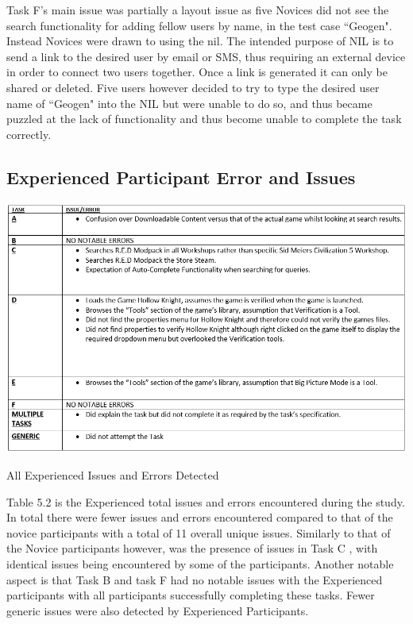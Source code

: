 Task F's main issue was partially a layout issue as five Novices did not see the search functionality for adding fellow users by name, in the test case ``Geogen". Instead Novices were drawn to using the \gls{nil}. The intended purpose of NIL is to send a link to the desired user by email or SMS, thus requiring an external device in order to connect two users together. Once a link is generated it can only be shared or deleted. Five users however decided to try to type the desired user name of ``Geogen" into the NIL but were unable to do so, and thus became puzzled at the lack of functionality and thus become unable to complete the task correctly.

\subsection{Experienced Participant Error and Issues}

\begin{table}[H]
\includegraphics[width=\linewidth]{Screenshots/ErrorRecords/Experienced/experiencedAllErrors.png}
\label{ExperiencedErrorsList}
\caption{All Experienced Issues and Errors Detected}
\end{table}

Table 5.2 is the Experienced total issues and errors encountered during the study. In total there were fewer issues and errors encountered compared to that of the novice participants with a total of 11 overall unique issues. Similarly to that of the Novice participants however, was the presence of issues in Task C , with identical issues being encountered by some of the participants. Another notable aspect is that Task B and task F had no notable issues with the Experienced participants with all participants successfully completing these tasks. Fewer generic issues were also detected by Experienced Participants. 

